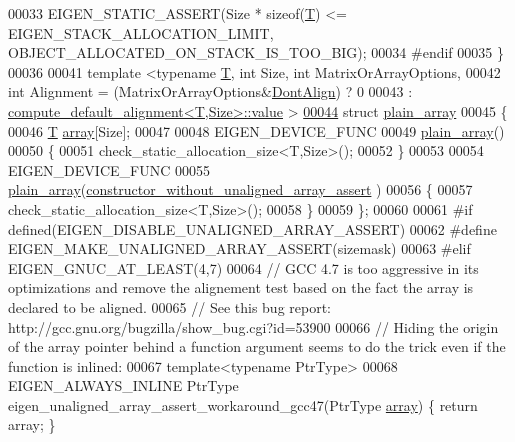\begin{DoxyCode}
00033   EIGEN\_STATIC\_ASSERT(Size * \textcolor{keyword}{sizeof}(\hyperlink{group___sparse_core___module}{T}) <= EIGEN\_STACK\_ALLOCATION\_LIMIT, 
      OBJECT\_ALLOCATED\_ON\_STACK\_IS\_TOO\_BIG);
00034 \textcolor{preprocessor}{  #endif}
00035 \}
00036 
00041 \textcolor{keyword}{template} <\textcolor{keyword}{typename} \hyperlink{group___sparse_core___module}{T}, \textcolor{keywordtype}{int} Size, \textcolor{keywordtype}{int} MatrixOrArrayOptions,
00042           \textcolor{keywordtype}{int} Alignment = (MatrixOrArrayOptions&\hyperlink{group__enums_ggaacded1a18ae58b0f554751f6cdf9eb13a40a452614141522dd313363dbbd65726}{DontAlign}) ? 0
00043                         : \hyperlink{struct_eigen_1_1internal_1_1compute__default__alignment}{compute\_default\_alignment<T,Size>::value} 
      >
\hyperlink{struct_eigen_1_1internal_1_1plain__array}{00044} \textcolor{keyword}{struct} \hyperlink{struct_eigen_1_1internal_1_1plain__array}{plain\_array}
00045 \{
00046   \hyperlink{group___sparse_core___module}{T} \hyperlink{class_eigen_1_1array}{array}[Size];
00047 
00048   EIGEN\_DEVICE\_FUNC
00049   \hyperlink{struct_eigen_1_1internal_1_1plain__array}{plain\_array}()
00050   \{ 
00051     check\_static\_allocation\_size<T,Size>();
00052   \}
00053 
00054   EIGEN\_DEVICE\_FUNC
00055   \hyperlink{struct_eigen_1_1internal_1_1plain__array}{plain\_array}(\hyperlink{struct_eigen_1_1internal_1_1constructor__without__unaligned__array__assert}{constructor\_without\_unaligned\_array\_assert}
      )
00056   \{ 
00057     check\_static\_allocation\_size<T,Size>();
00058   \}
00059 \};
00060 
00061 \textcolor{preprocessor}{#if defined(EIGEN\_DISABLE\_UNALIGNED\_ARRAY\_ASSERT)}
00062 \textcolor{preprocessor}{  #define EIGEN\_MAKE\_UNALIGNED\_ARRAY\_ASSERT(sizemask)}
00063 \textcolor{preprocessor}{#elif EIGEN\_GNUC\_AT\_LEAST(4,7) }
00064   \textcolor{comment}{// GCC 4.7 is too aggressive in its optimizations and remove the alignement test based on the fact the
       array is declared to be aligned.}
00065   \textcolor{comment}{// See this bug report: http://gcc.gnu.org/bugzilla/show\_bug.cgi?id=53900}
00066   \textcolor{comment}{// Hiding the origin of the array pointer behind a function argument seems to do the trick even if the
       function is inlined:}
00067   \textcolor{keyword}{template}<\textcolor{keyword}{typename} PtrType>
00068   EIGEN\_ALWAYS\_INLINE PtrType eigen\_unaligned\_array\_assert\_workaround\_gcc47(PtrType 
      \hyperlink{class_eigen_1_1array}{array}) \{ \textcolor{keywordflow}{return} array; \}

\end{DoxyCode}
